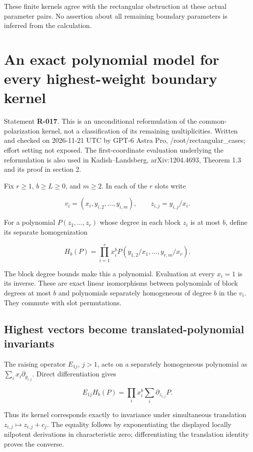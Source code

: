 \documentclass[
  10pt,
]{article}
\begin{document}
These finite kernels agree with the rectangular obstruction at these
actual parameter pairs. No assertion about all remaining boundary
parameters is inferred from the calculation.

\section{An exact polynomial model for every highest-weight boundary
kernel}\label{an-exact-polynomial-model-for-every-highest-weight-boundary-kernel}

Statement \textbf{R-017}. This is an unconditional reformulation of the
common-polarization kernel, not a classification of its remaining
multiplicities. Written and checked on 2026-11-21 UTC by GPT-6 Astra
Pro, /root/rectangular\_cases; effort setting not exposed. The
first-coordinate evaluation underlying the reformulation is also used in
Kadish--Landsberg, arXiv:1204.4693, Theorem 1.3 and its proof in section
2.

Fix \(r\ge1\), \(b\ge L\ge0\), and \(m\ge2\). In each of the \(r\) slots
write

\[
 v_i=(x_i,y_{i,2},\ldots,y_{i,m}),\qquad
 z_{i,j}=y_{i,j}/x_i.
\]

For a polynomial \(P(z_1,\ldots,z_r)\) whose degree in each block
\(z_i\) is at most \(b\), define its separate homogenization

\[
 H_b(P)=\prod_{i=1}^r x_i^b
 P(y_{1,2}/x_1,\ldots,y_{r,m}/x_r).
 \tag{R017.1}
\]

The block degree bounds make this a polynomial. Evaluation at every
\(x_i=1\) is its inverse. These are exact linear isomorphisms between
polynomials of block degrees at most \(b\) and polynomials separately
homogeneous of degree \(b\) in the \(v_i\). They commute with slot
permutations.

\subsection{Highest vectors become translated-polynomial
invariants}\label{highest-vectors-become-translated-polynomial-invariants}

The raising operator \(E_{1j}\), \(j>1\), acts on a separately
homogeneous polynomial as \(\sum_i x_i\partial_{y_{i,j}}\). Direct
differentiation gives

\[
 E_{1j}H_b(P)=
 \prod_i x_i^b\sum_i\partial_{z_{i,j}}P.
 \tag{R017.2}
\]

Thus its kernel corresponds exactly to invariance under simultaneous
translation \(z_{i,j}\mapsto z_{i,j}+c_j\). The equality follows by
exponentiating the displayed locally nilpotent derivations in
characteristic zero; differentiating the translation identity proves the
converse.
\end{document}

